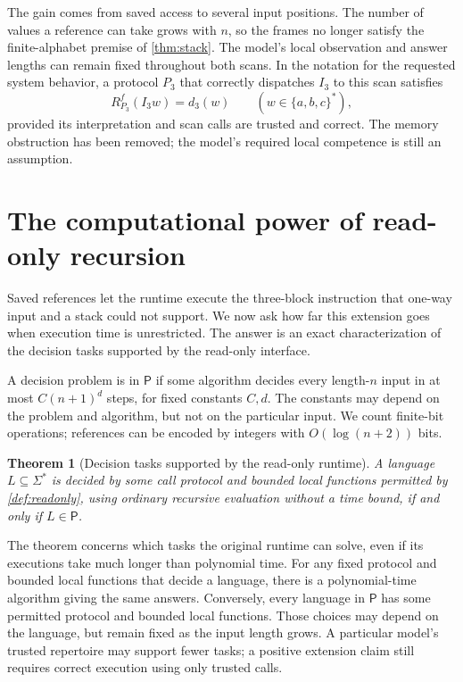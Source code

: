 \documentclass[11pt,twoside]{article}
\newtheorem{theorem}{Theorem}[section]
\theoremstyle{definition}
\theoremstyle{remark}
\begin{document}
The gain comes from saved access to several input positions. The number
of values a reference can take grows with $n$, so the frames no longer
satisfy the finite-alphabet premise of \cref{thm:stack}. The model's local
observation and answer lengths can remain fixed throughout both scans.
In the notation for the requested system behavior, a protocol $P_3$ that
correctly dispatches $I_3$ to this scan satisfies
\begin{equation}
 R_{P_3}^f(I_3w)=d_3(w)\qquad(w\in\{a,b,c\}^*),
 \label{eq:reference-instruction-success}
\end{equation}
provided its interpretation and scan calls are trusted and correct.
The memory obstruction has been removed; the model's required local
competence is still an assumption.

\section{The computational power of read-only recursion}
\label{sec:readonly-power}

Saved references let the runtime execute the three-block instruction that
one-way input and a stack could not support. We now ask how far this
extension goes when execution time is unrestricted. The answer is an exact
characterization of the decision tasks supported by the read-only interface.

A decision problem is in $\mathsf P$ if some algorithm decides every
length-$n$ input in at most $C(n+1)^d$ steps, for fixed constants $C,d$.
The constants may depend on the problem and algorithm, but not on the
particular input. We count finite-bit operations; references can be encoded
by integers with $O(\log(n+2))$ bits.

\begin{theorem}[Decision tasks supported by the read-only runtime]
\label{thm:cons-free}
A language $L\subseteq\Sigma^*$ is decided by some call protocol and
bounded local functions permitted by \cref{def:readonly}, using ordinary
recursive evaluation without a time bound, if and only if
$L\in\mathsf P$.
\end{theorem}

The theorem concerns which tasks the original runtime can solve, even if
its executions take much longer than polynomial time. For any fixed protocol
and bounded local functions that decide a language, there is a polynomial-time
algorithm giving the same answers. Conversely, every language in $\mathsf P$
has some permitted protocol and bounded local functions. Those choices may
depend on the language, but remain fixed as the input length grows.
A particular model's trusted repertoire may support fewer tasks; a positive
extension claim still requires correct execution using only trusted calls.
\end{document}
